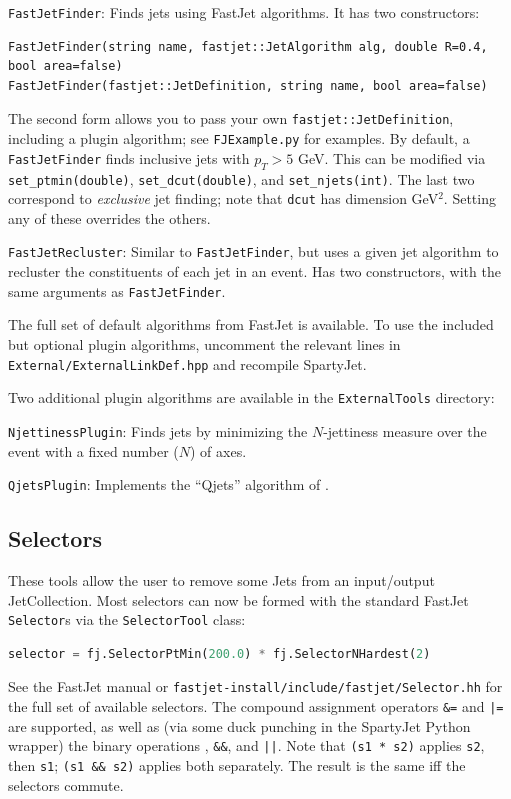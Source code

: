 \documentclass{article}
\newcommand{\prog}[1]{{\sc #1}\xspace}
\newcommand{\code}[1]{{\tt #1}\xspace}
\newcommand{\codes}[1]{{\tt #1}s\xspace}
\newcommand{\SJ}[0]{\prog{SpartyJet}}
\newcommand{\FJ}[0]{\prog{FastJet}}
\begin{document}
\begin{description}
\item \code{FastJetFinder}:
Finds jets using \FJ algorithms.  It has two constructors:
\begin{lstlisting}
FastJetFinder(string name, fastjet::JetAlgorithm alg, double R=0.4, bool area=false)
FastJetFinder(fastjet::JetDefinition, string name, bool area=false)
\end{lstlisting}
The second form allows you to pass your own \code{fastjet::JetDefinition}, including a plugin algorithm; see \verb+FJExample.py+ for examples.  By default, a \code{FastJetFinder} finds inclusive jets with $p_T > 5$ GeV.  This can be modified via \code{set\_ptmin(double)}, \code{set\_dcut(double)}, and \code{set\_njets(int)}.  The last two correspond to \emph{exclusive} jet finding; note that \code{dcut} has dimension GeV$^2$.  Setting any of these overrides the others.

\item \code{FastJetRecluster}:  Similar to \code{FastJetFinder}, but uses a given jet algorithm to recluster the constituents of each jet in an event.  Has two constructors, with the same arguments as \code{FastJetFinder}.
\end{description}

The full set of default algorithms from \FJ is available.  To use the included but optional plugin algorithms, uncomment the relevant lines in \verb+External/ExternalLinkDef.hpp+ and recompile \SJ.

Two additional plugin algorithms are available in the \verb+ExternalTools+ directory:

\begin{description}
\item \code{NjettinessPlugin}: Finds jets by minimizing the $N$-jettiness measure \cite{Njettiness, NSub2} over the event with a fixed number ($N$) of axes.
\item \code{QjetsPlugin}: Implements the ``Qjets'' algorithm of \cite{Qjets}.
\end{description}


\subsection{Selectors}
These tools allow the user to remove some Jets from an input/output JetCollection.  Most selectors can now be formed with the standard \FJ\,\codes{Selector} via the \code{SelectorTool} class:
\begin{lstlisting}[language=Python]
selector = fj.SelectorPtMin(200.0) * fj.SelectorNHardest(2)
\end{lstlisting}
See the \FJ manual or \verb+fastjet-install/include/fastjet/Selector.hh+ for the full set of available selectors.  The compound assignment operators \code{\&=} and \code{|=} are supported, as well as (via some duck punching in the \SJ Python wrapper) the binary operations \code{*}, \code{\&\&}, and \code{||}.   Note that \code{(s1 * s2)} applies \code{s2}, then \code{s1}; \code{(s1 \&\& s2)} applies both separately.  The result is the same iff the selectors commute.
\end{document}
